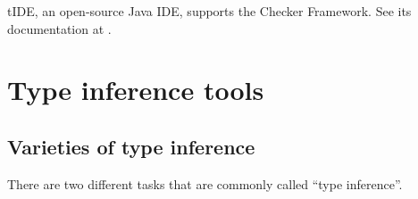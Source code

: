 \begin{sloppypar}
tIDE, an open-source Java IDE, supports the Checker Framework.  See its
documentation at .
\end{sloppypar}


\section{Type inference tools\label{type-inference-tools}}

\subsection{Varieties of type inference\label{type-inference-varieties}}

There are two different tasks that are commonly called ``type inference''.

